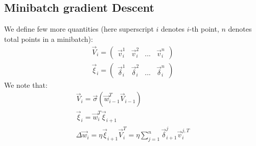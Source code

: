 \documentclass{article}
\begin{document}
\subsection{Minibatch gradient Descent}
We define few more quantities (here superscript $i$ denotes $i$-th point, $n$ denotes total points in a minibatch):
\begin{gather*}
\vec V_i = \begin{pmatrix}\vec v_i^1&\vec v_i^2&...&\vec v_i^n\end{pmatrix}\\
\vec \xi_i =\begin{pmatrix}\vec \delta_i^1&\vec \delta_i^2&...&\vec \delta_i^n\end{pmatrix}
\end{gather*}
We note that:
\begin{gather*}
\vec V_i = \vec \sigma (\vec w_{i-1}^T \vec V_{i-1})\\
\vec \xi_i = \vec w_i^T\vec \xi_{i+1}\\
\Delta \vec w_i = \eta\vec \xi_{i+1} \vec V_{i}^T=\eta \sum_{j=1}^n\vec \delta_{i+1}^j\vec v_i^{j,T}
\end{gather*}
\end{document}
